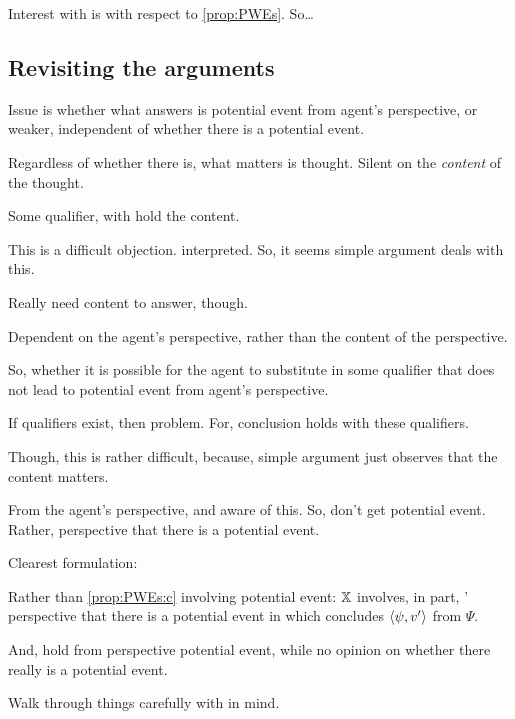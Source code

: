 \begin{note}
  Interest with \ptivity{} is with respect to \autoref{prop:PWEs}.
  So\dots
\end{note}

\subsection{Revisiting the arguments}
\label{cha:zSpA:sec:revisiting-arguments}

\begin{note}
  Issue is whether what answers \qzS{} is potential event from agent's perspective, or  weaker, independent of whether there is a potential event.

  Regardless of whether there is, what matters is thought.
  Silent on the \emph{content} of the thought.

  Some qualifier, with hold the content.

  This is a difficult objection.
  \qzS{} interpreted.
  So, it seems simple argument deals with this.

  Really need content to answer, though.

  Dependent on the agent's perspective, rather than the content of the perspective.

  So, whether it is possible for the agent to substitute in some qualifier that does not lead to potential event from agent's perspective.

  If qualifiers exist, then problem.
  For, conclusion holds with these qualifiers.

  Though, this is rather difficult, because, simple argument just observes that the content matters.

  From the agent's perspective, and aware of this.
  So, don't get potential event.
  Rather, perspective that there is a potential event.

  Clearest formulation:

  Rather than \ref{prop:PWEs:c} involving potential event:
  {
    \color{red}
    \(\qzSaV{}\) involves, in part, \vAgent{}' perspective that there is a potential event in which \vAgent{} concludes \(\pv{\psi}{v'}\) from \(\Psi\).
  }

  And, hold from perspective potential event, while no opinion on whether there really is a potential event.
\end{note}


\begin{note}
  Walk through things carefully with \ptivityQ{} in mind.
\end{note}

